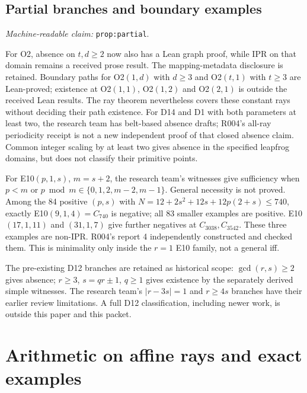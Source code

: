 \documentclass[11pt]{amsart}
\newcommand{\record}[1]{\nolinkurl{#1}}
\newcommand{\claimid}[1]{\par\nopagebreak\noindent\textit{Machine-readable claim:} \record{#1}.\par}
\theoremstyle{definition}\newtheorem{definition}{Definition}
\begin{document}
\subsection{Partial branches and boundary examples}\label{prop:partial}
\claimid{prop:partial}
For O2, absence on $t,d\ge2$ now also has a Lean graph proof, while
IPR on that domain remains a received prose result. The mapping-metadata
disclosure is retained. Boundary paths for O2$(1,d)$ with $d\ge3$ and
O2$(t,1)$ with $t\ge3$ are Lean-proved; existence at O2$(1,1)$,
O2$(1,2)$ and O2$(2,1)$ is outside the received Lean results. The ray
theorem nevertheless covers these constant rays without deciding their
path existence. For D14 and D1 with both parameters at least two,
the research team has belt-based absence drafts; R004's all-ray
periodicity receipt is not a new independent proof of that closed
absence claim. Common integer scaling by at least two gives absence
in the specified leapfrog domains, but does not classify their
primitive points.

For E10$(p,1,s)$, $m=s+2$, the research team's witnesses give
sufficiency when $p<m$ or
$p\bmod m\in\{0,1,2,m-2,m-1\}$. General necessity is not proved.
Among the 84 positive $(p,s)$ with
$N=12+2s^2+12s+12p(2+s)\le740$, exactly E10$(9,1,4)=C_{740}$
is negative; all 83 smaller examples are positive. E10$(17,1,11)$
and $(31,1,7)$ give further negatives at $C_{3038},C_{3542}$.
These three examples are non-IPR. R004's report 4 independently
constructed and checked them. This is minimality only inside the
$r=1$ E10 family, not a general iff.

The pre-existing D12 branches are retained as historical scope:
$\gcd(r,s)\ge2$ gives absence; $r\ge3$, $s=qr\pm1$, $q\ge1$
gives existence by the separately derived simple witnesses. The
research team's $|r-3s|=1$ and $r\ge4s$ branches have their earlier
review limitations. A full D12 classification, including newer work,
is outside this paper and this packet.

\section{Arithmetic on affine rays and exact examples}\label{sec:arithmetic}
\end{document}

